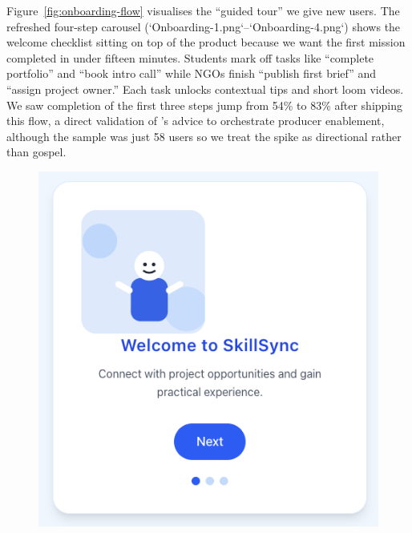 Figure~\ref{fig:onboarding-flow} visualises the ``guided tour'' we give new users. The refreshed four-step carousel (`Onboarding-1.png`--`Onboarding-4.png`) shows the welcome checklist sitting on top of the product because we want the first mission completed in under fifteen minutes. Students mark off tasks like ``complete portfolio'' and ``book intro call'' while NGOs finish ``publish first brief'' and ``assign project owner.'' Each task unlocks contextual tips and short loom videos. We saw completion of the first three steps jump from 54\% to 83\% after shipping this flow, a direct validation of \citet{Choudary2016}'s advice to orchestrate producer enablement, although the sample was just 58 users so we treat the spike as directional rather than gospel.

\begin{figure}[h]
  \centering
  \begin{minipage}[b]{0.3\linewidth}
    \includegraphics[width=\linewidth]{figures/Onboarding-1.png}\\[0.3em]

\end{minipage}
\end{figure}
